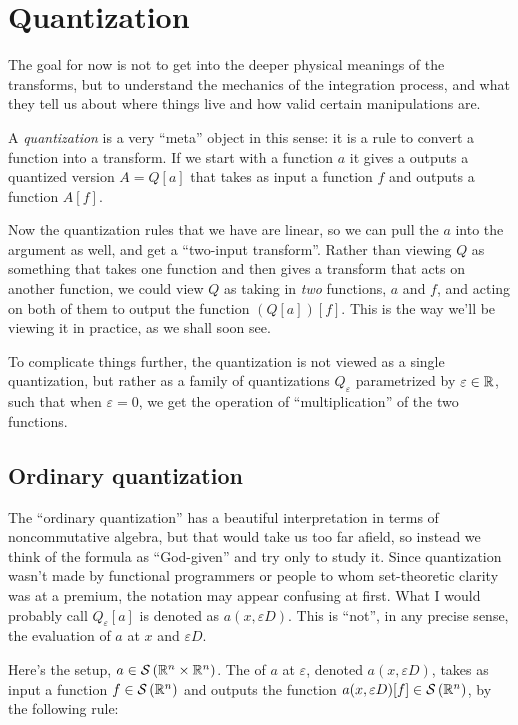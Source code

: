 \documentclass[a4paper]{amsart}
\newcommand{\schwarz}[1]{\mathcal{S}\left(#1\right)}
\begin{document}
\section{Quantization}

The goal for now is not to get into the deeper physical meanings of
the transforms, but to understand the mechanics of the integration
process, and what they tell us about where things live and how valid
certain manipulations are.

A {\em quantization} is a very ``meta'' object in this sense: it is a
rule to convert a function into a transform. If we start with a
function $a$ it gives a outputs a quantized version $A = Q[a]$ that takes as
input a function $f$ and outputs a function $A[f]$.

Now the quantization rules that we have are linear, so we can pull the
$a$ into the argument as well, and get a ``two-input
transform''. Rather than viewing $Q$ as something that takes one
function and then gives a transform that acts on another function, we
could view $Q$ as taking in {\em two} functions, $a$ and $f$, and
acting on both of them to output the function $(Q[a])[f]$. This is the
way we'll be viewing it in practice, as we shall soon see.

To complicate things further, the quantization is not viewed as a
single quantization, but rather as a family of quantizations $Q_\varepsilon$
parametrized by $\varepsilon \in \mathbb{R}$, such that when $\varepsilon = 0$, we
get the operation of ``multiplication'' of the two functions.

\subsection{Ordinary quantization}

The ``ordinary quantization'' has a beautiful interpretation in terms
of noncommutative algebra, but that would take us too far afield, so
instead we think of the formula as ``God-given'' and try only to study
it. Since quantization wasn't made by functional programmers or people
to whom set-theoretic clarity was at a premium, the notation may
appear confusing at first. What I would probably call
$Q_\varepsilon[a]$ is denoted as $a(x,\varepsilon D)$. This is
``not'', in any precise sense, the evaluation of $a$ at $x$ and
$\varepsilon D$.

Here's the setup, $a \in \schwarz{\R^n \times \R^n}$. The  of $a$ at $\varepsilon$, denoted $a(x,\varepsilon D)$,
takes as input a function $f \in \schwarz{\R^n}$ and outputs the
function $a(x,\varepsilon D)[f] \in \schwarz{\R^n}$, by the following
rule:
\end{document}
